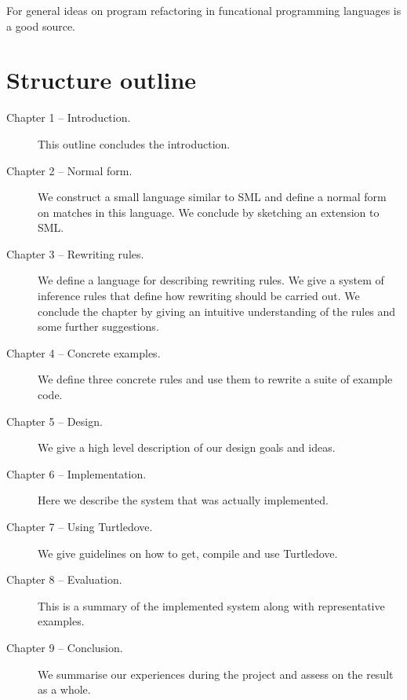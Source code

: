 For general ideas on program refactoring in funcational programming languages
\cite{HARE} is a good source.

\section{Structure outline}
\begin{description}
\item[Chapter 1 -- Introduction.]
  This outline concludes the introduction.
\item[Chapter 2 -- Normal form.]
  We construct a small language similar to SML and define a normal form on
  matches in this language. We conclude by sketching an extension to SML.
\item[Chapter 3 -- Rewriting rules.]
  We define a language for describing rewriting rules. We give a system of
  inference rules that define how rewriting should be carried out. We conclude
  the chapter by giving an intuitive understanding of the rules and some further
  suggestions.
\item[Chapter 4 -- Concrete examples.]
  We define three concrete rules and use them to rewrite a suite of example
  code.
\item[Chapter 5 -- Design.]
  We give a high level description of our design goals and ideas.
\item[Chapter 6 -- Implementation.]
  Here we describe the system that was actually implemented.
\item[Chapter 7 -- Using Turtledove.]
  We give guidelines on how to get, compile and use Turtledove.
\item[Chapter 8 -- Evaluation.]
  This is a summary of the implemented system along with representative examples.
\item[Chapter 9 -- Conclusion.]
  We summarise our experiences during the project and assess on the result as a
  whole.
\end{description}


